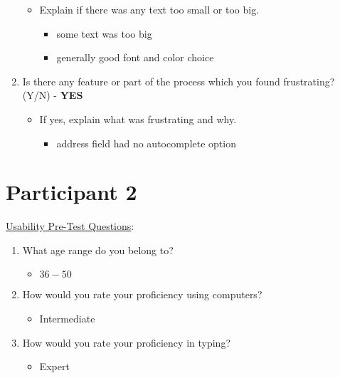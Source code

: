 \documentclass[12pt]{article}
\begin{document}
\begin{enumerate}
    \begin{itemize}
      \item Explain if there was any text too small or too big.
      \begin{itemize}
        \item some text was too big
        \item generally good font and color choice
      \end{itemize}
    \end{itemize}
  \item  Is there any feature or part of the process which you found frustrating? (Y/N) - \textbf{YES}
    \begin{itemize}
      \item If yes, explain what was frustrating and why.
      \begin{itemize}
        \item address field had no autocomplete option
      \end{itemize}
    \end{itemize}
\end{enumerate}

\section{Participant 2}
\underline{Usability Pre-Test Questions}:
\begin{enumerate}
  \item What age range do you belong to?
    \begin{itemize}
      \item $36 - 50$
    \end{itemize}
	\item How would you rate your proficiency using computers?
    \begin{itemize}
      \item Intermediate
    \end{itemize}
  \item How would you rate your proficiency in typing?
    \begin{itemize}
      \item Expert
    \end{itemize}
\end{enumerate}
\end{document}
